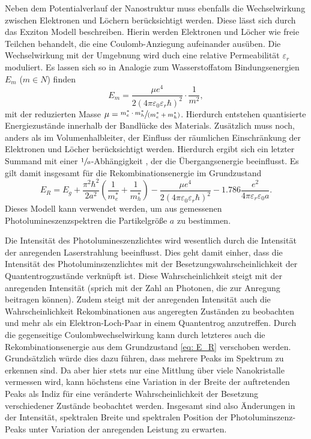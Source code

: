 Neben dem Potentialverlauf der Nanostruktur muss ebenfalls die Wechselwirkung zwischen Elektronen und Löchern berücksichtigt werden.
Diese lässt sich durch das Exziton Modell beschreiben. Hierin werden Elektronen und Löcher wie freie Teilchen behandelt, die eine
Coulomb-Anziegung aufeinander ausüben. Die Wechselwirkung mit der Umgebnung wird duch eine relative Permeabilität
$\varepsilon_r$ moduliert. Es lassen sich so in Analogie zum Wasserstoffatom Bindungsenergien $E_m$ ($m \in N$) finden
\begin{equation}
  E_m = \frac{\mu e^4}{2 (4\pi\varepsilon_0 \varepsilon_r \hbar)^2} \cdot \frac{1}{m^2},
\end{equation}
mit der reduzierten Masse $\mu = \sfrac{m_e^* \cdot m_h^*}{(m_e^* + m_h^*)}$.
Hierdurch entstehen quantisierte Energiezustände innerhalb der
Bandlücke des Materials. Zusätzlich muss noch, anders als im Volumenhalbleiter, der Einfluss der räumlichen
Einschränkung der Elektronen und Löcher berücksichtigt werden. Hierdurch ergibt sich ein letzter Summand mit einer
$\sfrac{1}{a}$-Abhängigkeit \cite{}, der die Übergangsenergie beeinflusst. Es gilt damit insgesamt für die
Rekombinationsenergie im Grundzustand
\begin{equation}
  E_R = E_g + \frac{\pi^2\hbar^2}{ 2  a^2} \left(\frac{1}{m_e^*} + \frac{1}{m_h^*}\right) -\frac{\mu e^4}{2 (4\pi\varepsilon_0 \varepsilon_r \hbar)^2}
  - \num{1.786} \frac{e^2}{4\pi\varepsilon_r\varepsilon_0 a}.
  \label{eq: E_R}
\end{equation}
Dieses Modell kann verwendet werden, um aus gemessenen Photolumineszenzspektren die Partikelgröße $a$ zu bestimmen.

Die Intensität des Photolumineszenzlichtes wird wesentlich durch die Intensität der anregenden Laserstrahlung beeinflusst.
Dies geht damit einher, dass die Intensität des Photoluminszenzlichtes mit der Besetzungswahrscheinlichkeit der
Quantentrogzustände verknüpft ist. Diese Wahrscheinlichkeit steigt mit der anregenden Intensität (sprich mit der Zahl
an Photonen, die zur Anregung beitragen können).
Zudem steigt mit der anregenden Intensität auch die Wahrscheinlichkeit Rekombinationen aus angeregten Zuständen
zu beobachten und mehr als ein Elektron-Loch-Paar
in einem Quantentrog anzutreffen.
Durch die gegenseitige Coulombwechselwirkung kann durch letzteres auch die
Rekombinationsenergie aus dem Grundzustand \eqref{eq: E_R} verschoben werden. Grundsätzlich würde dies dazu führen, dass
mehrere Peaks im Spektrum zu erkennen sind. Da aber hier stets nur eine Mittlung über viele Nanokristalle vermessen wird,
kann höchstens eine Variation in der Breite der auftretenden Peaks als Indiz für eine veränderte Wahrscheinlichkeit der
Besetzung verschiedener Zustände beobachtet werden.
Insgesamt sind also Änderungen in der Intensität, spektralen Breite und spektralen Position der Photoluminszenz-Peaks
unter Variation der anregenden Leistung zu erwarten.
